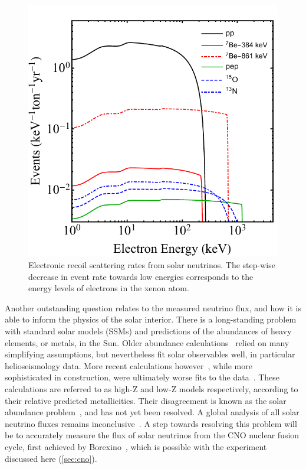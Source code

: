 \begin{figure}[!htbp]
\begin{center}
\includegraphics[width=0.99\columnwidth]{fig_spectrum_smear.pdf}
\caption{Electronic recoil scattering rates from solar neutrinos. The step-wise decrease in event rate towards low energies corresponds to the energy levels of electrons in the xenon atom.}\label{fig:electronrates}
\end{center}\end{figure}

Another outstanding question relates to the measured neutrino flux, and how it is able to inform the physics of the solar interior. There is a long-standing problem with standard solar models (SSMs) and predictions of the abundances of heavy elements, or metals, in the Sun. Older abundance calculations~\cite{Grevesse:1998bj} relied on many simplifying assumptions, but nevertheless fit solar observables well, in particular helioseismology data. More recent calculations however~\cite{Asplund:2009fu}, while more sophisticated in construction, were ultimately worse fits to the data~\cite{Asplund:2009fu,Scott:2014lka,Scott:2014mka,Grevesse:2014nka}. These calculations are referred to as high-Z and low-Z models respectively, according to their relative predicted metallicities. Their disagreement is known as the solar abundance problem~\cite{Serenelli:2009yc}, and has not yet been resolved. A global analysis of all solar neutrino fluxes remains inconclusive~\cite{Bergstrom:2016cbh}. A step towards resolving this problem will be to accurately measure the flux of solar neutrinos from the CNO nuclear fusion cycle, first achieved by Borexino~\cite{Agostini:2020mfq}, which is possible with the experiment discussed here (\autoref{sec:cno}).

